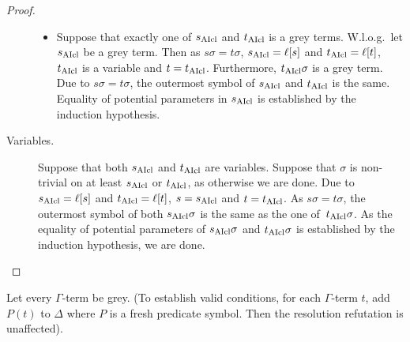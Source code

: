 \documentclass[,%
	paper=a4,%
	DIV12, %
	twoside=false,%
	liststotoc,
	bibtotoc,
	draft=false,%
	numbers=noendperiod
]{scrartcl}
\begin{document}
\begin{proof}
\begin{description}
\begin{itemize}
				\item
					Suppose that exactly one of $s_{\operatorname{AIcl}}$ and $t_{\operatorname{AIcl}}$ is a grey terms. W.l.o.g.~let $s_{\operatorname{AIcl}}$ be a grey term. Then as $s\sigma=t\sigma$, $s_{\operatorname{AIcl}} = \ell[s]$ and $t_{\operatorname{AIcl}} = \ell[t]$, $t_{\operatorname{AIcl}}$ is a variable and $t=t_{\operatorname{AIcl}}$.
					Furthermore, $t_{\operatorname{AIcl}}\sigma$ is a grey term. 
					Due to $s\sigma = t\sigma$, the outermost symbol of $s_{\operatorname{AIcl}}$ and $t_{\operatorname{AIcl}}$ is the same.
					Equality of potential parameters in $s_{\operatorname{AIcl}}$ is established by the induction hypothesis.
			\end{itemize}


		\item[Variables.]
			Suppose that both $s_{\operatorname{AIcl}}$ and $t_{\operatorname{AIcl}}$ are variables. 
			Suppose that $\sigma$ is non-trivial on at least $s_{\operatorname{AIcl}}$ or $t_{\operatorname{AIcl}}$, as otherwise we are done.
			Due to $s_{\operatorname{AIcl}} = \ell[s]$ and $t_{\operatorname{AIcl}} = \ell[t]$, $s = s_{\operatorname{AIcl}}$ and $t=t_{\operatorname{AIcl}}$.
			As $s\sigma=t\sigma$,  the outermost symbol of both $s_{\operatorname{AIcl}}\sigma$ is the same as the one of~$t_{\operatorname{AIcl}}\sigma$. As the equality of potential parameters of $s_{\operatorname{AIcl}}\sigma$ and $t_{\operatorname{AIcl}}\sigma$ is established by the induction hypothesis, we are done.
			\qedhere
	\end{description}
\end{proof}

\newcommand{\clauseOnePrime}{\AIclause(C_1)^*}
\newcommand{\clauseTwoPrime}{\AIclause(C_2)^*}

	Let every $\Gamma$-term be grey. (To establish valid conditions, for each $\Gamma$-term $t$, add $P(t)$ to $\Delta$ where $P$ is a fresh predicate symbol. Then the resolution refutation is unaffected).
\end{document}
